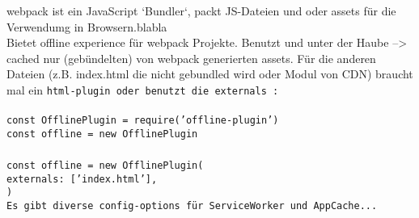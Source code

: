 webpack ist ein JavaScript `Bundler`, packt JS-Dateien und oder assets für die Verwendumg in Browsern.blabla\\
Bietet offline experience für webpack Projekte. Benutzt  und  unter der Haube --> cached nur (gebündelten) von webpack generierten assets. Für die anderen Dateien (z.B. index.html die nicht gebundled wird oder Modul von CDN) braucht mal ein \tt{html-plugin} oder benutzt die \tt{externals} :\\\\
\tt{const OfflinePlugin = require('offline-plugin')\\
const offline = new OfflinePlugin\\\\
const offline = new OfflinePlugin({\\
    externals: ['index.html'],\\
})}\\
Es gibt diverse config-options für ServiceWorker und AppCache...~\cite{webpack-gh}
